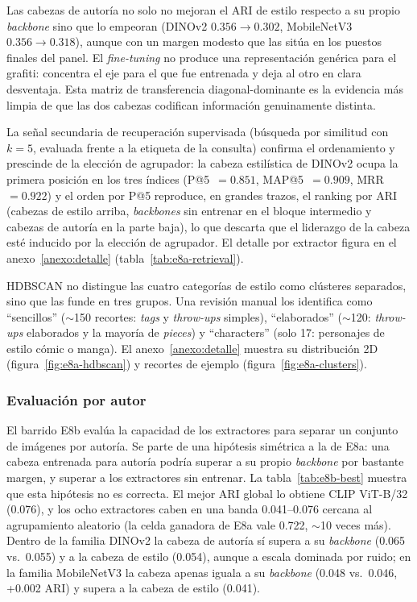 Las cabezas de autoría no solo no mejoran el ARI de estilo respecto a su
propio \textit{backbone} sino que lo empeoran (DINOv2 $0.356\to 0.302$, MobileNetV3
$0.356\to 0.318$), aunque con un margen modesto que las sitúa en los puestos
finales del panel. El \textit{fine-tuning} no produce una representación
genérica para el grafiti: concentra el eje para el que fue entrenada y deja al
otro en clara desventaja. Esta matriz de transferencia diagonal-dominante es la
evidencia más limpia de que las dos cabezas codifican información genuinamente
distinta.

La señal secundaria de recuperación supervisada (búsqueda por similitud con
$k=5$, evaluada frente a la etiqueta de la consulta) confirma el ordenamiento
y prescinde de la elección de agrupador: la cabeza estilística de DINOv2 ocupa
la primera posición en los tres índices (P@5~$=0.851$, MAP@5~$=0.909$,
MRR~$=0.922$) y el orden por P@5 reproduce, en grandes trazos, el ranking por
ARI (cabezas de estilo arriba, \textit{backbones} sin entrenar en el bloque
intermedio y cabezas de autoría en la parte baja), lo que descarta que el
liderazgo de la cabeza esté inducido por la elección de agrupador. El detalle
por extractor figura en el anexo~\ref{anexo:detalle}
(tabla~\ref{tab:e8a-retrieval}).

HDBSCAN no distingue las cuatro categorías de estilo como clústeres separados,
sino que las funde en tres grupos. Una revisión manual los identifica como
\enquote{sencillos} ($\sim$150 recortes: \textit{tags} y \textit{throw-ups}
simples), \enquote{elaborados} ($\sim$120: \textit{throw-ups} elaborados y la
mayoría de \textit{pieces}) y \enquote{characters} (solo 17: personajes de
estilo cómic o manga). El anexo~\ref{anexo:detalle} muestra su distribución 2D
(figura~\ref{fig:e8a-hdbscan}) y recortes de ejemplo
(figura~\ref{fig:e8a-clusters}).

\subsubsection{Evaluación por autor}
\label{subsubsec:res-autor}
El barrido E8b evalúa la capacidad de los extractores para separar un conjunto
de imágenes por autoría. Se parte de una hipótesis simétrica a la de E8a: una
cabeza entrenada para autoría podría superar a su propio \textit{backbone} por
bastante margen, y superar a los extractores sin entrenar. La
tabla~\ref{tab:e8b-best} muestra que esta hipótesis no es correcta. El mejor
ARI global lo obtiene CLIP ViT-B/32 (0.076), y los ocho extractores caben en
una banda 0.041--0.076 cercana al agrupamiento aleatorio (la celda ganadora de
E8a vale 0.722, $\sim$10 veces más). Dentro de la familia DINOv2 la cabeza de
autoría sí supera a su \textit{backbone} (0.065 vs.\ 0.055) y a la cabeza de
estilo (0.054), aunque a escala dominada por ruido; en la familia MobileNetV3
la cabeza apenas iguala a su \textit{backbone} (0.048 vs.\ 0.046, +0.002 ARI)
y supera a la cabeza de estilo (0.041).

